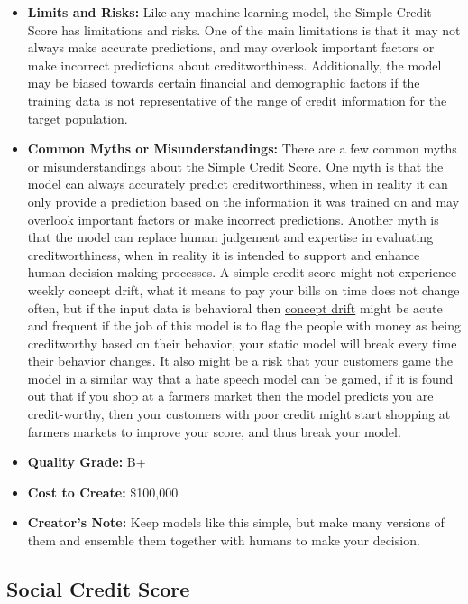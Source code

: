 \begin{itemize}
\begin{itemize}
    \item \textbf{Limits and Risks:} Like any machine learning model, the Simple Credit Score has limitations and risks. One of the main limitations is that it may not always make accurate predictions, and may overlook important factors or make incorrect predictions about creditworthiness. Additionally, the model may be biased towards certain financial and demographic factors if the training data is not representative of the range of credit information for the target population.
    \item \textbf{Common Myths or Misunderstandings:} There are a few common myths or misunderstandings about the Simple Credit Score. One myth is that the model can always accurately predict creditworthiness, when in reality it can only provide a prediction based on the information it was trained on and may overlook important factors or make incorrect predictions. Another myth is that the model can replace human judgement and expertise in evaluating creditworthiness, when in reality it is intended to support and enhance human decision-making processes. A simple credit score might not experience weekly concept drift, what it means to pay your bills on time does not change often, but if the input data is behavioral then \hyperref[sec:drift]{concept drift} might be acute and frequent if the job of this model is to flag the people with money as being creditworthy based on their behavior, your static model will break every time their behavior changes. It also might be a risk that your customers game the model in a similar way that a hate speech model can be gamed, if it is found out that if you shop at a farmers market then the model predicts you are credit-worthy, then your customers with poor credit might start shopping at farmers markets to improve your score, and thus break your model.
    \item \textbf{Quality Grade:} B+
    \item \textbf{Cost to Create:} \$100,000
    \item \textbf{Creator's Note:} Keep models like this simple, but make many versions of them and ensemble them together with humans to make your decision. 
\end{itemize}

\subsection{Social Credit Score}


\end{itemize}
